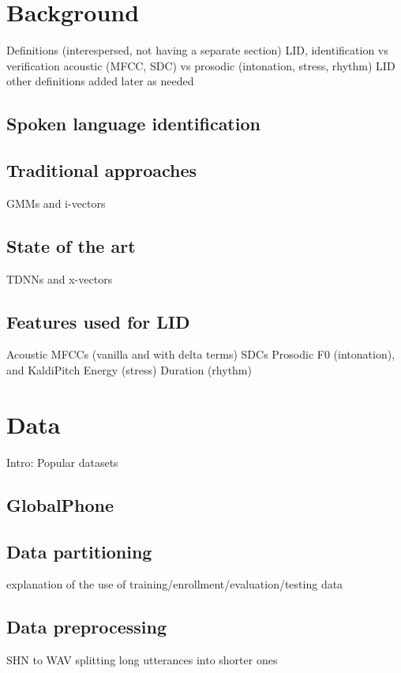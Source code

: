 \documentclass[bsc,frontabs,twoside,singlespacing,parskip,deptreport]{infthesis}
\begin{document}
\chapter{Background}{
  Definitions (interespersed, not having a separate section)
    LID, identification vs verification
    acoustic (MFCC, SDC) vs prosodic (intonation, stress, rhythm) LID
    other definitions added later as needed

  \section{Spoken language identification}{

  }
  \section{Traditional approaches}{
    GMMs and i-vectors
  }
  \section{State of the art}{
    TDNNs and x-vectors
  }
  \section{Features used for LID}{
    Acoustic
      MFCCs (vanilla and with delta terms)
      SDCs
    Prosodic
      F0 (intonation), and KaldiPitch
      Energy (stress)
      Duration (rhythm)
  }
}

\chapter{Data}{
  Intro: Popular datasets
  \section{GlobalPhone}{

  }
  \section{Data partitioning}{
    explanation of the use of training/enrollment/evaluation/testing data
  }
  \section{Data preprocessing}{
    SHN to WAV
    splitting long utterances into shorter ones
  }
}
\end{document}
